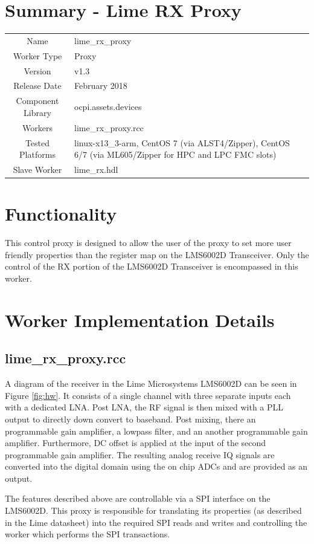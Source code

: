 \documentclass{article}
\author{} %
\date{Version \docVersion} %
\title{\docTitle}
\def\docVersion{1.3}
\def\comp{lime\_rx\_proxy}
\def\Comp{Lime RX Proxy}
\begin{document}
\section*{Summary - \Comp}
\begin{tabular}{|c|M{13.5cm}|}
	\hline
	                  &                \\
	\hline
	Name              & \comp          \\
	\hline
	Worker Type       & Proxy          \\
	\hline
	Version           & v\docVersion \\
	\hline
	Release Date      & February 2018 \\
	\hline
	Component Library & ocpi.assets.devices   \\
	\hline
	Workers           & \comp.rcc      \\
	\hline
	Tested Platforms  & linux-x13\_3-arm, CentOS 7 (via ALST4/Zipper), CentOS 6/7 (via ML605/Zipper for HPC and LPC FMC slots) \\
	\hline
	Slave Worker      & lime\_rx.hdl   \\
	\hline
\end{tabular}

\section*{Functionality}
This control proxy is designed to allow the user of the proxy to set more user friendly properties than the register map on the LMS6002D Transceiver.  Only the control of the RX portion of the LMS6002D Transceiver is encompassed in this worker.

\section*{Worker Implementation Details}
\subsection*{\comp.rcc}
A diagram of the receiver in the Lime Microsystems LMS6002D can be seen in Figure \ref{fig:hw}. It consists of a single channel with three separate inputs each with a dedicated LNA. Post LNA, the RF signal is then mixed with a PLL output to directly down convert to baseband. Post mixing, there an programmable gain amplifier, a lowpass filter, and an another programmable gain amplifier. Furthermore, DC offset is applied at the input of the second programmable gain amplifier. The resulting analog receive IQ signals are converted into the digital domain using the on chip ADCs and are provided as an output.\par\medskip
\noindent The features described above are controllable via a SPI interface on the LMS6002D. This proxy is responsible for translating its properties (as described in the Lime datasheet) into the required SPI reads and writes and controlling the worker which performs the SPI transactions.
\newpage
\end{document}

